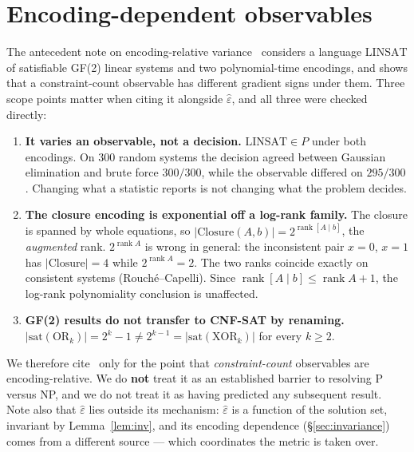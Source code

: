\documentclass[11pt,a4paper]{article}
\theoremstyle{plain}
\theoremstyle{definition}
\theoremstyle{remark}
\newcommand{\epshat}{\hat{\varepsilon}}
\begin{document}
\section{Encoding-dependent observables}\label{sec:erv}

The antecedent note on encoding-relative variance~\cite{dejesus2026erv}
considers a language $\mathrm{LINSAT}$ of satisfiable GF(2) linear systems and
two polynomial-time encodings, and shows that a constraint-count observable has
different gradient signs under them. Three scope points matter when citing it
alongside $\epshat$, and all three were checked directly:

\begin{enumerate}[nosep]
\item \textbf{It varies an observable, not a decision.} $\mathrm{LINSAT} \in P$
      under both encodings. On $300$ random systems the decision agreed between
      Gaussian elimination and brute force $300/300$, while the observable
      differed on $295/300$. Changing what a statistic reports is not changing
      what the problem decides.
\item \textbf{The closure encoding is exponential off a log-rank family.}
      The closure is spanned by whole equations, so
      $|\mathrm{Closure}(A,b)| = 2^{\operatorname{rank}[A \mid b]}$, the
      \emph{augmented} rank. $2^{\operatorname{rank}A}$ is wrong in general:
      the inconsistent pair $x=0$, $x=1$ has $|\mathrm{Closure}|=4$ while
      $2^{\operatorname{rank}A}=2$. The two ranks coincide exactly on consistent
      systems (Rouch\'e--Capelli). Since
      $\operatorname{rank}[A\mid b] \le \operatorname{rank}A + 1$, the
      log-rank polynomiality conclusion is unaffected.
\item \textbf{GF(2) results do not transfer to CNF-SAT by renaming.}
      $|\mathrm{sat}(\mathrm{OR}_k)| = 2^k-1 \neq 2^{k-1} =
      |\mathrm{sat}(\mathrm{XOR}_k)|$ for every $k \ge 2$.
\end{enumerate}

We therefore cite~\cite{dejesus2026erv} only for the point that
\emph{constraint-count} observables are encoding-relative. We do \textbf{not}
treat it as an established barrier to resolving P versus NP, and we do not treat
it as having predicted any subsequent result. Note also that $\epshat$ lies
outside its mechanism: $\epshat$ is a function of the solution set, invariant by
Lemma~\ref{lem:inv}, and its encoding dependence (\S\ref{sec:invariance}) comes
from a different source --- which coordinates the metric is taken over.
\end{document}
